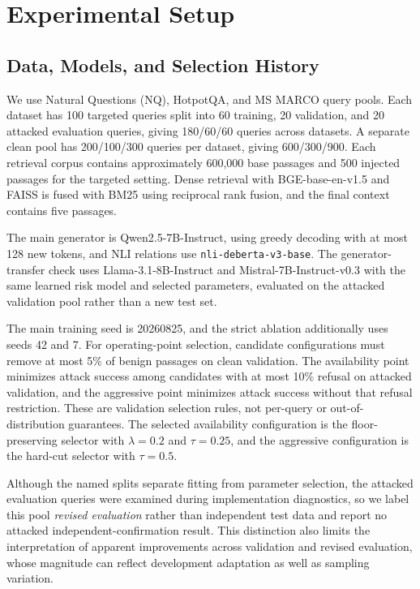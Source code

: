 \documentclass[sigconf]{aamas}
\begin{document}
\section{Experimental Setup}
\label{sec:protocol}
\subsection{Data, Models, and Selection History}
We use Natural Questions (NQ), HotpotQA, and MS MARCO query pools. Each dataset has 100 targeted queries split into 60 training, 20 validation, and 20 attacked evaluation queries, giving 180/60/60 queries across datasets. A separate clean pool has 200/100/300 queries per dataset, giving 600/300/900. Each retrieval corpus contains approximately 600,000 base passages and 500 injected passages for the targeted setting. Dense retrieval with BGE-base-en-v1.5 and FAISS is fused with BM25 using reciprocal rank fusion, and the final context contains five passages.

The main generator is Qwen2.5-7B-Instruct, using greedy decoding with at most 128 new tokens, and NLI relations use \texttt{nli-deberta-v3-base}. The generator-transfer check uses Llama-3.1-8B-Instruct and Mistral-7B-Instruct-v0.3 with the same learned risk model and selected parameters, evaluated on the attacked validation pool rather than a new test set.

The main training seed is 20260825, and the strict ablation additionally uses seeds 42 and 7. For operating-point selection, candidate configurations must remove at most 5\% of benign passages on clean validation. The availability point minimizes attack success among candidates with at most 10\% refusal on attacked validation, and the aggressive point minimizes attack success without that refusal restriction. These are validation selection rules, not per-query or out-of-distribution guarantees. The selected availability configuration is the floor-preserving selector with $\lambda=0.2$ and $\tau=0.25$, and the aggressive configuration is the hard-cut selector with $\tau=0.5$.

Although the named splits separate fitting from parameter selection, the attacked evaluation queries were examined during implementation diagnostics, so we label this pool \emph{revised evaluation} rather than independent test data and report no attacked independent-confirmation result. This distinction also limits the interpretation of apparent improvements across validation and revised evaluation, whose magnitude can reflect development adaptation as well as sampling variation.
\end{document}
